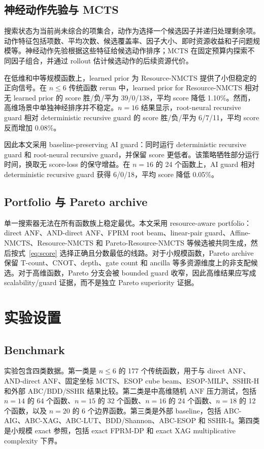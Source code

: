 \documentclass[UTF8,fontset=macnew,11pt]{ctexart}
\newcommand{\method}{Resource-NMCTS}
\newcommand{\pareto}{Pareto-Resource-NMCTS}
\newcommand{\anf}{\ensuremath{\mathrm{ANF}}}
\newcommand{\mcts}{\ensuremath{\mathrm{MCTS}}}
\begin{document}
\subsection{神经动作先验与 MCTS}

搜索状态为当前尚未综合的项集合，动作为选择一个候选因子并递归处理剩余项。动作特征包括项数、平均次数、候选覆盖率、因子大小、即时资源收益和子问题规模等。神经动作先验根据这些特征给候选动作排序；\mcts{} 在固定预算内探索不同因子组合，并通过 rollout 估计候选动作的后续资源代价。

在低维和中等规模函数上，learned prior 为 \method{} 提供了小但稳定的正向信号。在 $n\leq6$ 传统函数 rerun 中，learned prior for \method{} 相对无 learned prior 的 score 胜/负/平为 39/0/138，平均 score 降低 1.10\%。然而，高维场景中单独神经排序并不稳定。$n=16$ 结果显示，root-neural recursive guard 相对 deterministic recursive guard 的 score 胜/负/平为 6/7/11，平均 score 反而增加 0.08\%。

因此本文采用 baseline-preserving AI guard：同时运行 deterministic recursive guard 和 root-neural recursive guard，并保留 score 更低者。该策略牺牲部分运行时间，换取无 score-loss 的保守增益。在 $n=16$ 的 24 个函数上，AI guard 相对 deterministic recursive guard 获得 6/0/18，平均 score 降低 0.05\%。

\subsection{Portfolio 与 Pareto archive}

单一搜索器无法在所有函数族上稳定最优。本文采用 resource-aware portfolio：direct ANF、AND-direct ANF、FPRM root beam、linear-pair guard、Affine-NMCTS、\method{} 和 \pareto{} 等候选被共同生成，然后按式~\eqref{eq:score} 选择正确且分数最低的线路。对于小规模函数，Pareto archive 保留 T-count、CNOT、depth、gate count 和 ancilla 等多资源维度上的非支配候选。对于高维函数，Pareto 分支会被 bounded guard 收窄，因此高维结果应写成 scalability/guard 证据，而不是独立 Pareto superiority 证据。

\section{实验设置}

\subsection{Benchmark}

实验包含四类数据。第一类是 $n\leq6$ 的 177 个传统函数，用于与 direct ANF、AND-direct ANF、固定坐标 MCTS、ESOP cube beam、ESOP-MILP、SSHR-H 和外部 ABC/BDD/SSHR 结果比较。第二类是中高维随机 \anf{} 压力测试，包括 $n=14$ 的 64 个函数、$n=15$ 的 32 个函数、$n=16$ 的 24 个函数、$n=18$ 的 12 个函数，以及 $n=20$ 的 6 个边界函数。第三类是外部 baseline，包括 ABC-AIG、ABC-XAG、ABC-LUT、BDD/Shannon、ABC-ESOP 和 SSHR-I。第四类是小规模 exact 参照，包括 exact FPRM-DP 和 exact XAG multiplicative complexity 下界。
\end{document}
